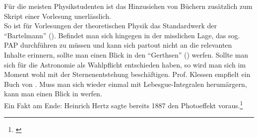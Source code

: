 \documentclass{scrartcl}
\begin{document}
Für die meisten Physikstudenten ist das Hinzusiehen von Büchern zusätzlich zum Skript einer Vorlesung unerlässlich. \\
So ist für Vorlesungen der theoretischen Physik das Standardwerk der ``Bartelmann'' (\cite{Bartelmann}).
Befindet man sich hingegen in der misslichen Lage, das sog. PAP durchführen zu müssen und kann sich partout nicht an die relevanten Inhalte erinnern, sollte man einen Blick in den ``Gerthsen'' (\cite{Gerthsen}) werfen.
Sollte man sich für die Astronomie als Wahlpflicht entschieden haben, so wird man sich im Moment wohl mit der Sternenentstehung beschäftigen. Prof. Klessen empfielt ein Buch von \cite{astro}.
Muss man sich wieder einmal mit Lebesgue-Integralen herumärgern, kann man einen Blick in \cite[][Kap. X]{aescher} werfen.\\
Ein Fakt am Ende: Heinrich Hertz sagte bereits 1887 den Photoeffekt voraus.\footnote{\cite[vgl.][S. 998f.]{Hertz1887}}

\newpage

\printbibliography[title=Bücher, type=book]
\printbibliography[title=Artikel, type=article]
\end{document}
